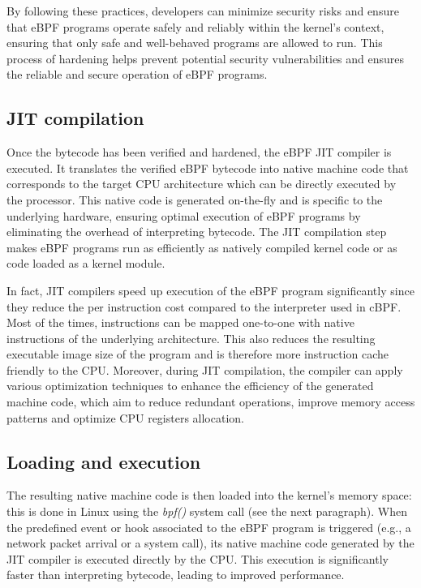 By following these practices, developers can minimize security risks and ensure that eBPF programs operate safely and reliably within the kernel's context, ensuring that only safe and well-behaved programs are allowed to run.
This process of hardening helps prevent potential security vulnerabilities and ensures the reliable and secure operation of eBPF programs.

\subsection{JIT compilation}

Once the bytecode has been verified and hardened, the eBPF JIT compiler is executed. 
It translates the verified eBPF bytecode into native machine code that corresponds to the target CPU architecture which can be directly executed by the processor. 
This native code is generated on-the-fly and is specific to the underlying hardware, ensuring optimal execution of eBPF programs by eliminating the overhead of interpreting bytecode.
The JIT compilation step makes eBPF programs run as efficiently as natively compiled kernel code or as code loaded as a kernel module.

In fact, JIT compilers speed up execution of the eBPF program significantly since they reduce the per instruction cost compared to the interpreter used in cBPF. 
Most of the times, instructions can be mapped one-to-one with native instructions of the underlying architecture. 
This also reduces the resulting executable image size of the program and is therefore more instruction cache friendly to the CPU.
Moreover, during JIT compilation, the compiler can apply various optimization techniques to enhance the efficiency of the generated machine code, which aim to reduce redundant operations, improve memory access patterns and optimize CPU registers allocation.

\subsection{Loading and execution}

The resulting native machine code is then loaded into the kernel's memory space: this is done in Linux using the \textit{bpf()} system call (see the next paragraph).
When the predefined event or hook associated to the eBPF program is triggered (e.g., a network packet arrival or a system call), its native machine code generated by the JIT compiler is executed directly by the CPU. 
This execution is significantly faster than interpreting bytecode, leading to improved performance.

